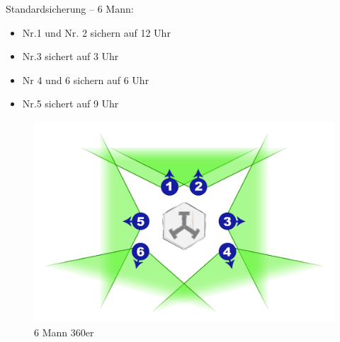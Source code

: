	Standardsicherung – 6 Mann: 
		\begin{itemize}
			\item Nr.1 und Nr. 2 sichern auf 12 Uhr 
			\item Nr.3 sichert auf 3 Uhr 
			\item Nr 4 und 6 sichern auf 6 Uhr
			\item Nr.5 sichert auf 9 Uhr
			
		\end{itemize}

		\begin{figure}[htbp]
			\centering
			\includegraphics[width=15cm]{./img/grundlagen/sicherungen/360grad_sicherung_6mann.jpg}	
			\caption{6 Mann 360er}
		\end{figure}
		

